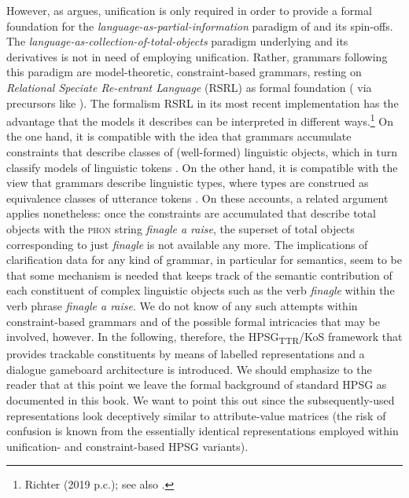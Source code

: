 \documentclass[output=paper
 	        ,biblatex
                ,babelshorthands
                ,newtxmath
                ,draftmode
                ,colorlinks, citecolor=brown
]{langscibook}
\begin{document}
However, as \citet[Chapter~2]{Richter:2000} argues, unification is only required in order to provide a formal foundation for the \textit{language-as-partial-information} paradigm of \citet{Pollard:Sag:1987} and its spin-offs. 
%
The \textit{language-as-collection-of-total-objects} paradigm underlying \citet{Pollard:Sag:1994} and its derivatives is not in need of employing unification.
%
Rather, grammars following this paradigm are model-theoretic, constraint-based grammars, resting on \emph{Relational Speciate Re-entrant Language} (RSRL) as formal foundation (\citealt{Richter:2000} via precursors like \citealt{King:1999}). %
%
The formalism RSRL in its most recent implementation \citep{Richter:2004} has the advantage that the models it describes can be interpreted in different ways.\footnote{Richter (2019 p.c.); see also .}
%
On the one hand, it is compatible with the idea that grammars accumulate constraints that describe classes of (well-formed) linguistic objects, which in turn classify models of linguistic tokens
\citep{King:1999}.
%
On the other hand, it is compatible with the view that grammars describe linguistic types, where types are construed as equivalence classes of utterance tokens \citep{Pollard:1999}.
%
On these accounts, a related argument applies nonetheless: once the constraints are accumulated that describe total objects with the \textsc{phon} string \textit{finagle a raise}, the superset of total objects corresponding to just \textit{finagle} is not available any more.
%
The implications of clarification data for any kind of grammar, in particular for semantics, seem to be that some mechanism is needed that keeps track of the semantic contribution of each constituent of complex linguistic objects such as the verb \textit{finagle} within the verb phrase \textit{finagle a raise}.
%
We do not know of any such attempts within constraint-based grammars and of the possible formal intricacies that may be involved, however.
%
In the following, therefore, the HPSG\textsubscript{TTR}/KoS framework that provides trackable constituents by means of labelled representations and a dialogue gameboard architecture is introduced.
%
We should emphasize to the reader that at this point we leave the formal background of standard HPSG as documented in this book.
%
We want to point this out since the subsequently-used representations look deceptively similar to attribute-value matrices (the risk of confusion is known from the essentially identical representations employed within unification- and constraint-based HPSG variants).
\end{document}
